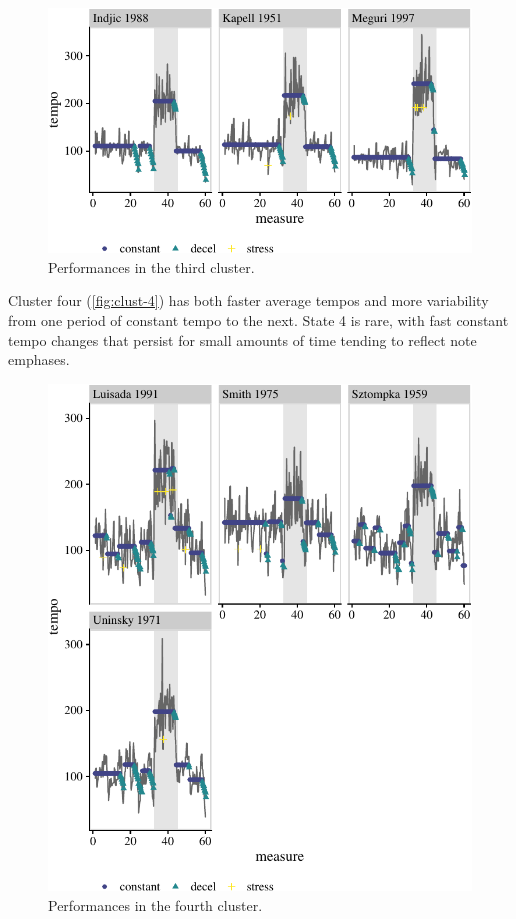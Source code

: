 \documentclass[aoas]{aoas/imsart}
\begin{document}
\begin{figure}

{\centering \includegraphics{gfx/clust-3-1} 

}

\caption{Performances in the third cluster.}\label{fig:clust-3}
\end{figure}

Cluster four (\autoref{fig:clust-4}) has both faster average tempos and
more variability from one period of constant tempo to the next. State 4
is rare, with fast constant tempo changes that persist for small amounts
of time tending to reflect note emphases.

\begin{figure}

{\centering \includegraphics{gfx/clust-4-1} 

}

\caption{Performances in the fourth cluster.}\label{fig:clust-4}
\end{figure}
\end{document}
